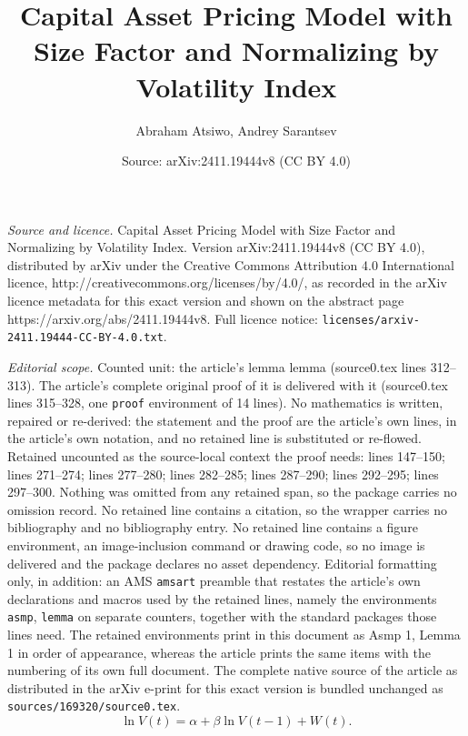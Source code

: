 \documentclass[10pt,a4paper]{amsart}
\title{Capital Asset Pricing Model with Size Factor and Normalizing by Volatility Index}
\author{Abraham Atsiwo, Andrey Sarantsev}
\date{Source: arXiv:2411.19444v8 (CC BY 4.0)}
\begin{document}
\maketitle

\noindent\emph{Source and licence.} Capital Asset Pricing Model with Size Factor and Normalizing by Volatility Index. Version arXiv:2411.19444v8 (CC BY 4.0), distributed by arXiv under the Creative Commons Attribution 4.0 International licence, http://creativecommons.org/licenses/by/4.0/, as recorded in the arXiv licence metadata for this exact version and shown on the abstract page https://arxiv.org/abs/2411.19444v8. Full licence notice: \texttt{licenses/arxiv-2411.19444-CC-BY-4.0.txt}.\par\smallskip

\noindent\textit{Editorial scope.} Counted unit: the article's lemma lemma (source0.tex lines 312--313). The article's complete original proof of it is delivered with it (source0.tex lines 315--328, one \texttt{proof} environment of 14 lines). No mathematics is written, repaired or re-derived: the statement and the proof are the article's own lines, in the article's own notation, and no retained line is substituted or re-flowed.  Retained uncounted as the source-local context the proof needs: lines 147--150; lines 271--274; lines 277--280; lines 282--285; lines 287--290; lines 292--295; lines 297--300.  Nothing was omitted from any retained span, so the package carries no omission record.  No retained line contains a citation, so the wrapper carries no bibliography and no bibliography entry.  No retained line contains a figure environment, an image-inclusion command or drawing code, so no image is delivered and the package declares no asset dependency.  Editorial formatting only, in addition: an AMS \texttt{amsart} preamble that restates the article's own declarations and macros used by the retained lines, namely the environments \texttt{asmp}, \texttt{lemma} on separate counters, together with the standard packages those lines need.  The retained environments print in this document as Asmp 1, Lemma 1 in order of appearance, whereas the article prints the same items with the numbering of its own full document.  The complete native source of the article as distributed in the arXiv e-print for this exact version is bundled unchanged as \texttt{sources/169320/source0.tex}.
\begin{equation}
\label{eq:ln-VIX}
\ln V(t) = \alpha + \beta \ln V(t-1) + W(t).
\end{equation}
\end{document}

